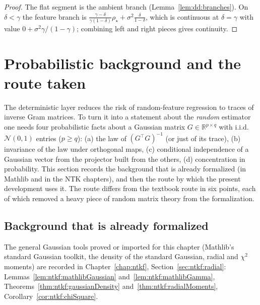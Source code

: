 \begin{proof}
  \leanok
The flat segment is the ambient branch (Lemma~\ref{lem:dd:branches}). On $\delta<\gamma$ the feature branch is
$\frac{\gamma-\delta}{\gamma(1-\delta)}\rho_\star+\sigma^2\frac\delta{1-\delta}$, which is continuous at $\delta=\gamma$ with value
$0+\sigma^2\gamma/(1-\gamma)$; combining left and right pieces gives continuity.
\end{proof}


\section{Probabilistic background and the route taken}\label{sec:dd:route}

The deterministic layer reduces the risk of random-feature regression to traces of inverse Gram matrices. To turn it into a statement
about the \emph{random} estimator one needs four probabilistic facts about a Gaussian matrix $G\in\mathbb R^{p\times q}$ with i.i.d.\
$\mathcal N(0,1)$ entries ($p\ge q$): (a) the law of $(G^\top G)^{-1}$ (or just of its trace), (b) invariance of the law under
orthogonal maps, (c) conditional independence of a Gaussian vector from the projector built from the others, (d) concentration in
probability. This section records the background that is already formalized (in Mathlib and in the NTK chapters), and then the route
by which the present development uses it. The route differs from the textbook route in six points, each of which removed a heavy
piece of random matrix theory from the formalization.

\subsection{Background that is already formalized}

The general Gaussian tools proved or imported for this chapter (Mathlib's standard Gaussian toolkit, the density of the standard Gaussian, radial and $\chi^2$ moments) are recorded in Chapter~\ref{chap:ntkf}, Section~\ref{sec:ntkf:radial}: Lemmas~\ref{lem:ntkf:mathlibGaussian} and~\ref{lem:ntkf:mathlibGamma}, Theorems~\ref{thm:ntkf:gaussianDensity} and~\ref{thm:ntkf:radialMoments}, Corollary~\ref{cor:ntkf:chiSquare}.




